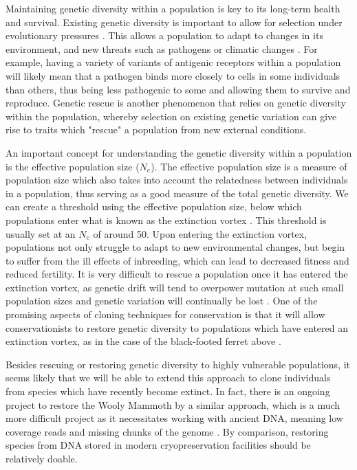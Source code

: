 \documentclass[10pt]{article}
\begin{document}
	Maintaining genetic diversity within a population is key to its long-term health and
	survival. Existing genetic diversity is important to allow for selection under
	evolutionary pressures \cite{harmonConservationSmallPopulations2010}. This allows a population to adapt to changes in its environment,
	and new threats such as pathogens or climatic changes \cite{mccallumTasmanianDevilFacial2008}. For example, having a variety
	of variants of antigenic receptors within a population will likely mean that a pathogen
	binds more closely to cells in some individuals than others, thus being less pathogenic
	to some and allowing them to survive and reproduce. Genetic rescue is another phenomenon
	that relies on genetic diversity within the population, whereby selection on existing
	genetic variation can give rise to traits which "rescue" a population from new external
	conditions.
	
	An important concept for understanding the genetic diversity within a population is the
	effective population size ($N_e$). The effective population size is a measure of
	population size which also takes into account the relatedness between individuals in
	a population, thus serving as a good measure of the total genetic diversity. We can
	create a threshold using the effective population size, below which populations enter
	what is known as the extinction vortex \cite{harmonConservationSmallPopulations2010}. This threshold is usually set at an $N_e$ of
	around 50. Upon entering the extinction vortex, populations not only struggle to
	adapt to new environmental changes, but begin to suffer from the ill effects of
	inbreeding, which can lead to decreased fitness and reduced fertility. It is very
	difficult to rescue a population once it has entered the extinction vortex, as genetic
	drift will tend to overpower mutation at such small population sizes and genetic
	variation will continually be lost \cite{harmonConservationSmallPopulations2010}. One of the promising aspects of cloning techniques 
	for conservation is that it will allow conservationists to restore genetic diversity to
	populations which have entered an extinction vortex, as in the case of the black-footed
	ferret above \cite{wiselyRoadMap21st2015}. 

	
	Besides rescuing or restoring genetic diversity to highly vulnerable populations,
	it seems likely that we will be able to extend this approach to clone individuals from species which
	have recently become extinct. In fact, there is an ongoing project to restore
	the Wooly Mammoth by a similar approach, which is a much more difficult project
	as it necessitates working with ancient DNA, meaning low coverage reads and 
	missing chunks of the genome \cite{novakDeExtinction2018}. By comparison, restoring species from DNA stored 
	in modern cryopreservation facilities should be relatively doable.
	
\end{document}
